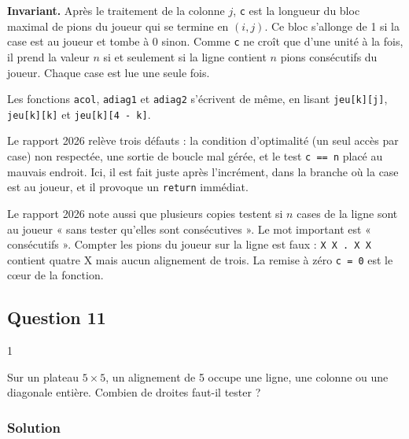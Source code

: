 \documentclass[11pt,a4paper]{article}
\begin{document}
\textbf{Invariant.} Après le traitement de la colonne \(j\), \texttt{c} est la longueur du bloc maximal de pions du joueur qui se termine en \((i,j)\). Ce bloc s'allonge de 1 si la case est au joueur et tombe à 0 sinon. Comme \texttt{c} ne croît que d'une unité à la fois, il prend la valeur \(n\) si et seulement si la ligne contient \(n\) pions consécutifs du joueur. Chaque case est lue une seule fois.

Les fonctions \texttt{acol}, \texttt{adiag1} et \texttt{adiag2} s'écrivent de même, en lisant \texttt{jeu{[}k{]}{[}j{]}}, \texttt{jeu{[}k{]}{[}k{]}} et \texttt{jeu{[}k{]}{[}4\ -\ k{]}}.

\begin{piege}

Le rapport 2026 relève trois défauts : la condition d'optimalité (un seul accès par case) non respectée, une sortie de boucle mal gérée, et le test \texttt{c\ ==\ n} placé au mauvais endroit. Ici, il est fait juste après l'incrément, dans la branche où la case est au joueur, et il provoque un \texttt{return} immédiat.

\end{piege}

\begin{piege}

Le rapport 2026 note aussi que plusieurs copies testent si \(n\) cases de la ligne sont au joueur « sans tester qu'elles sont consécutives ». Le mot important est « consécutifs ». Compter les pions du joueur sur la ligne est faux : \texttt{X\ X\ .\ X\ X} contient quatre X mais aucun alignement de trois. La remise à zéro \texttt{c\ =\ 0} est le cœur de la fonction.

\end{piege}

\hypertarget{question-11}{%
\subsection{Question 11}\label{question-11}}

\begin{indication}{1}

Sur un plateau \(5\times5\), un alignement de 5 occupe une ligne, une colonne ou une diagonale entière. Combien de droites faut-il tester ?

\end{indication}

\hypertarget{solution-10}{%
\subsubsection{Solution}\label{solution-10}}
\end{document}
